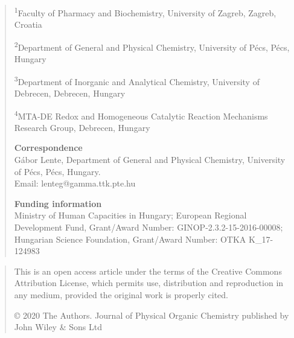 \documentclass{article}
\begin{document}
\begin{quote}\small
\noindent \textsuperscript{1}Faculty of Pharmacy and Biochemistry, University of Zagreb, Zagreb, Croatia\par
\noindent \textsuperscript{2}Department of General and Physical Chemistry, University of Pécs, Pécs, Hungary\par
\noindent \textsuperscript{3}Department of Inorganic and Analytical Chemistry, University of Debrecen, Debrecen, Hungary\par
\noindent \textsuperscript{4}MTA-DE Redox and Homogeneous Catalytic Reaction Mechanisms Research Group, Debrecen, Hungary\par
\medskip
\noindent \textbf{Correspondence}\\
Gábor Lente, Department of General and Physical Chemistry, University of Pécs, Pécs, Hungary.\\
Email: lenteg@gamma.ttk.pte.hu\par
\medskip
\noindent \textbf{Funding information}\\
Ministry of Human Capacities in Hungary; European Regional Development Fund, Grant/Award Number: GINOP-2.3.2-15-2016-00008; Hungarian Science Foundation, Grant/Award Number: OTKA K\_17-124983\par
\end{quote}

\begin{quote}\small
\noindent This is an open access article under the terms of the Creative Commons Attribution License, which permits use, distribution and reproduction in any medium, provided the original work is properly cited.\par
\noindent © 2020 The Authors. Journal of Physical Organic Chemistry published by John Wiley \& Sons Ltd
\end{quote}
\end{document}
